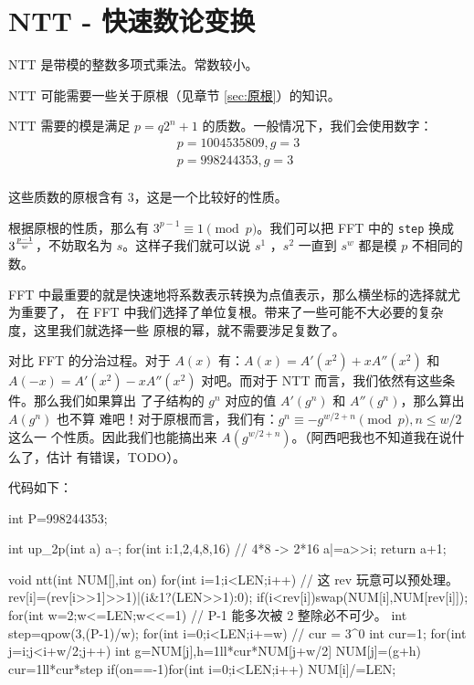 \section{NTT - 快速数论变换}
NTT 是带模的整数多项式乘法。常数较小。

NTT 可能需要一些关于原根（见章节 \ref{sec:原根}）的知识。

NTT 需要的模是满足 $p = q2^n + 1$ 的质数。一般情况下，我们会使用数字：
$$\begin{aligned}
    p = 1004535809, g = 3 \\
    p = 998244353,  g = 3 \\
\end{aligned}$$

这些质数的原根含有 $3$，这是一个比较好的性质。

根据原根的性质，那么有 $3 ^ {p - 1} \equiv 1 \pmod p$。我们可以把 FFT 中的
\verb|step| 换成 $3 ^ {p - 1 \over w}$，不妨取名为 $s$。这样子我们就可以说 $s^1$
，$s^2$ 一直到 $s^w$ 都是模 $p$ 不相同的数。

FFT 中最重要的就是快速地将系数表示转换为点值表示，那么横坐标的选择就尤为重要了，
在 FFT 中我们选择了单位复根。带来了一些可能不大必要的复杂度，这里我们就选择一些
原根的幂，就不需要涉足复数了。

对比 FFT 的分治过程。对于 $A(x)$ 有：$A(x) = A'(x^2) + xA''(x^2)$ 和 $A(-x) =
A'(x^2) - xA''(x^2)$ 对吧。而对于 NTT 而言，我们依然有这些条件。那么我们如果算出
了子结构的 $g^n$ 对应的值 $A'(g^n)$ 和 $A''(g^n)$，那么算出 $A(g^{n})$ 也不算
难吧！对于原根而言，我们有：$g^n \equiv -g^{w/2 + n} \pmod p, n \le w/2$ 这么一
个性质。因此我们也能搞出来 $A(g^{w/2+n})$。（阿西吧我也不知道我在说什么了，估计
有错误，TODO）。

代码如下：
\begin{Cpp}
int P=998244353;

int up_2p(int a){
  a--; for(int i:{1,2,4,8,16}) // 4*8 -> 2*16
    a|=a>>i;
  return a+1;
}

void ntt(int NUM[],int on){
  for(int i=1;i<LEN;i++){
    // 这 rev 玩意可以预处理。
    rev[i]=(rev[i>>1]>>1)|(i&1?(LEN>>1):0);
    if(i<rev[i])swap(NUM[i],NUM[rev[i]]);
  }
  for(int w=2;w<=LEN;w<<=1){
    // P-1 能多次被 2 整除必不可少。
    int step=qpow(3,(P-1)/w);
    for(int i=0;i<LEN;i+=w){
      // cur = 3^0
      int cur=1;
      for(int j=i;j<i+w/2;j++){
        int g=NUM[j],h=1ll*cur*NUM[j+w/2]%
        NUM[j]=(g+h)%
        cur=1ll*cur*step%
      }
    }
  }
  if(on==-1)for(int i=0;i<LEN;i++)
    NUM[i]/=LEN;
}
\end{Cpp}

